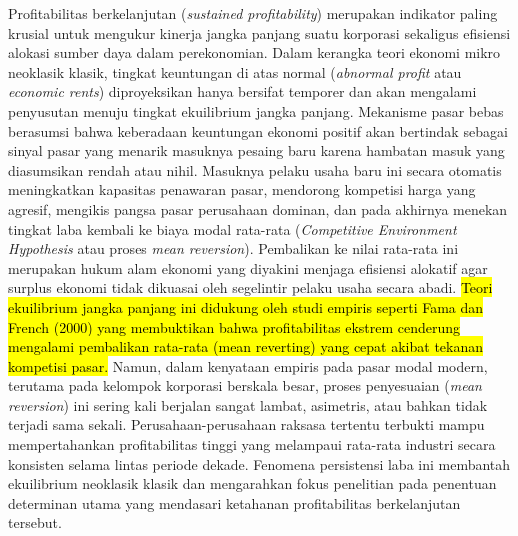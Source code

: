 \documentclass[12pt,a4paper]{article}
\begin{document}
Profitabilitas berkelanjutan (\emph{sustained profitability}) merupakan
indikator paling krusial untuk mengukur kinerja jangka panjang suatu
korporasi sekaligus efisiensi alokasi sumber daya dalam perekonomian.
Dalam kerangka teori ekonomi mikro neoklasik klasik, tingkat keuntungan
di atas normal (\emph{abnormal profit} atau \emph{economic rents})
diproyeksikan hanya bersifat temporer dan akan mengalami penyusutan
menuju tingkat ekuilibrium jangka panjang. Mekanisme pasar bebas
berasumsi bahwa keberadaan keuntungan ekonomi positif akan bertindak
sebagai sinyal pasar yang menarik masuknya pesaing baru karena hambatan
masuk yang diasumsikan rendah atau nihil. Masuknya pelaku usaha baru ini
secara otomatis meningkatkan kapasitas penawaran pasar, mendorong
kompetisi harga yang agresif, mengikis pangsa pasar perusahaan dominan,
dan pada akhirnya menekan tingkat laba kembali ke biaya modal rata-rata
(\emph{Competitive Environment Hypothesis} atau proses \emph{mean
reversion}). Pembalikan ke nilai rata-rata ini merupakan hukum alam
ekonomi yang diyakini menjaga efisiensi alokatif agar surplus ekonomi
tidak dikuasai oleh segelintir pelaku usaha secara abadi.
\hl{Teori ekuilibrium jangka panjang ini didukung oleh studi empiris seperti Fama dan French (2000) yang membuktikan bahwa profitabilitas ekstrem cenderung mengalami pembalikan rata-rata (mean reverting) yang cepat akibat tekanan kompetisi pasar.}
Namun, dalam kenyataan empiris pada pasar modal modern, terutama pada
kelompok korporasi berskala besar, proses penyesuaian (\emph{mean
reversion}) ini sering kali berjalan sangat lambat, asimetris, atau
bahkan tidak terjadi sama sekali. Perusahaan-perusahaan raksasa tertentu
terbukti mampu mempertahankan profitabilitas tinggi yang melampaui
rata-rata industri secara konsisten selama lintas periode dekade.
Fenomena persistensi laba ini membantah ekuilibrium neoklasik klasik dan
mengarahkan fokus penelitian pada penentuan determinan utama yang
mendasari ketahanan profitabilitas berkelanjutan tersebut.
\end{document}
